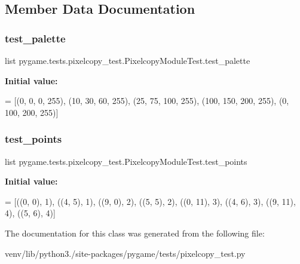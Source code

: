 \subsection{Member Data Documentation}
\mbox{\label{classpygame_1_1tests_1_1pixelcopy__test_1_1_pixelcopy_module_test_ae977de3468dd8e4b525cd7076e54993a}} 
\subsubsection{\texorpdfstring{test\+\_\+palette}{test\_palette}}
{\footnotesize\ttfamily list pygame.\+tests.\+pixelcopy\+\_\+test.\+Pixelcopy\+Module\+Test.\+test\+\_\+palette\hspace{0.3cm}{\ttfamily [static]}}

{\bfseries Initial value\+:}
\begin{DoxyCode}
=  [(0, 0, 0, 255),
                    (10, 30, 60, 255),
                    (25, 75, 100, 255),
                    (100, 150, 200, 255),
                    (0, 100, 200, 255)]
\end{DoxyCode}
\mbox{\label{classpygame_1_1tests_1_1pixelcopy__test_1_1_pixelcopy_module_test_a0e60707dd7ddd9dc57b9a1d765d8289b}} 
\subsubsection{\texorpdfstring{test\+\_\+points}{test\_points}}
{\footnotesize\ttfamily list pygame.\+tests.\+pixelcopy\+\_\+test.\+Pixelcopy\+Module\+Test.\+test\+\_\+points\hspace{0.3cm}{\ttfamily [static]}}

{\bfseries Initial value\+:}
\begin{DoxyCode}
=  [((0, 0), 1), ((4, 5), 1), ((9, 0), 2),
                   ((5, 5), 2), ((0, 11), 3), ((4, 6), 3),
                   ((9, 11), 4), ((5, 6), 4)]
\end{DoxyCode}


The documentation for this class was generated from the following file\+:\begin{DoxyCompactItemize}
\item 
venv/lib/python3./site-\/packages/pygame/tests/pixelcopy\+\_\+test.\+py\end{DoxyCompactItemize}

